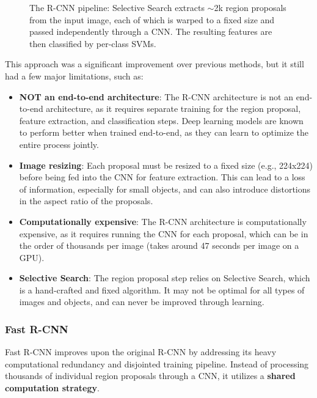\begin{figure}[H]
    \centering
    \resizebox{\textwidth}{!}{}
    \caption{The R-CNN pipeline: Selective Search extracts $\sim$2k region proposals from the input image, each of which is warped to a fixed size and passed independently through a CNN. The resulting features are then classified by per-class SVMs.}
    \label{fig:rcnn-architecture}
\end{figure}

This approach was a significant improvement over previous methods, but it still had a few major limitations, such as:
\begin{itemize}
    \item \textbf{NOT an end-to-end architecture}: The R-CNN architecture is not an end-to-end architecture, as it requires separate training for the region proposal, feature extraction, and classification steps.
    Deep learning models are known to perform better when trained end-to-end, as they can learn to optimize the entire process jointly.
    
    \item \textbf{Image resizing}: Each proposal must be resized to a fixed size (e.g., 224x224) before being fed into the CNN for feature extraction.
    This can lead to a loss of information, especially for small objects, and can also introduce distortions in the aspect ratio of the proposals.
    
    \item \textbf{Computationally expensive}: The R-CNN architecture is computationally expensive, as it requires running the CNN for each proposal, 
    which can be in the order of thousands per image (takes around 47 seconds per image on a GPU).
    
    \item \textbf{Selective Search}: The region proposal step relies on Selective Search, which is a hand-crafted and fixed algorithm.
    It may not be optimal for all types of images and objects, and can never be improved through learning.
\end{itemize}

\subsubsection{Fast R-CNN}
Fast R-CNN improves upon the original R-CNN by addressing its heavy computational redundancy and disjointed training pipeline. 
Instead of processing thousands of individual region proposals through a CNN, it utilizes a \textbf{shared computation strategy}.

